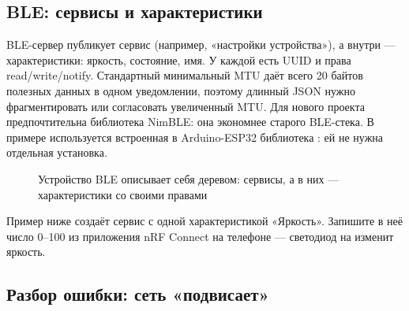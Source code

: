 

\subsection{BLE: сервисы и характеристики}

BLE-сервер публикует сервис (например, «настройки устройства»), а внутри --- характеристики: яркость,
состояние, имя. У каждой есть UUID и права read/write/notify. Стандартный минимальный MTU даёт всего
20 байтов полезных данных в одном уведомлении, поэтому длинный JSON нужно фрагментировать или
согласовать увеличенный MTU. Для нового проекта предпочтительна библиотека NimBLE: она экономнее
старого BLE-стека. В примере используется встроенная в Arduino-ESP32 библиотека :
ей не нужна отдельная установка.

\begin{figure}[H]
\centering
{}
\caption{Устройство BLE описывает себя деревом: сервисы, а в них --- характеристики со своими правами}
\end{figure}

Пример ниже создаёт сервис с одной характеристикой «Яркость». Запишите в неё число 0--100 из
приложения nRF Connect на телефоне --- светодиод на  изменит яркость.



\subsection{Разбор ошибки: сеть «подвисает»}

